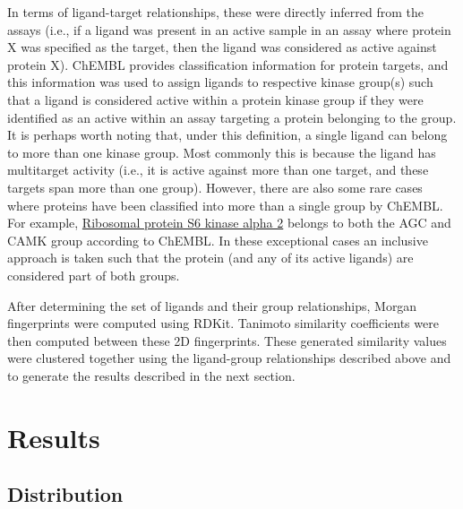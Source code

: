 \documentclass[11pt]{article}
\begin{document}
In terms of ligand-target relationships, these were directly inferred from the assays (i.e., if a ligand was present in an active sample in an assay where protein X was specified as the target, then the ligand was considered as active against protein X). 
ChEMBL provides classification information for protein targets, and this information was used to assign ligands to respective kinase group(s) such that a ligand is considered active within a protein kinase group if they were identified as an active within an assay targeting a protein belonging to the group. 
It is perhaps worth noting that, under this definition, a single ligand can belong to more than one kinase group. 
Most commonly this is because the ligand has multitarget activity (i.e., it is active against more than one target, and these targets span more than one group). 
However, there are also some rare cases where proteins have been classified into more than a single group by ChEMBL. 
For example, \href{https://www.ebi.ac.uk/chembl/explore/target/CHEMBL3906}{Ribosomal protein S6 kinase alpha 2} belongs to both the AGC and CAMK group according to ChEMBL. 
In these exceptional cases an inclusive approach is taken such that the protein (and any of its active ligands) are considered part of both groups. 

After determining the set of ligands and their group relationships, Morgan fingerprints were computed using RDKit. 
Tanimoto similarity coefficients were then computed between these 2D fingerprints. 
These generated similarity values were clustered together using the ligand-group relationships described above and to generate the results described in the next section.
\section*{Results}
\subsection*{Distribution}
\end{document}
